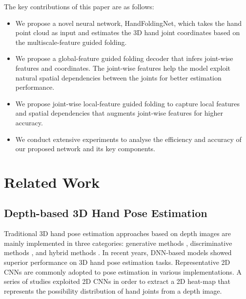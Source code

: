 \documentclass[10pt,twocolumn,letterpaper]{article}
\begin{document}
The key contributions of this paper are as follows:
\begin{itemize}\setlength{\itemsep}{0pt}
\setlength{\parsep}{0pt}
\setlength{\parskip}{0pt}



\item We propose a novel neural network, HandFoldingNet, which takes the hand point cloud as input and estimates the 3D hand joint coordinates based on the multiscale-feature guided folding. 

\item  We propose a global-feature guided folding decoder that infers joint-wise features and coordinates. The joint-wise features help the model exploit natural spatial dependencies between the joints for better estimation performance.

\item  We propose joint-wise local-feature guided folding to capture local features and spatial dependencies that augments joint-wise features for higher accuracy.

\item  We conduct extensive experiments to analyse the efficiency and accuracy of our proposed network and its key components.

\end{itemize}





\section{Related Work}
\subsection{Depth-based 3D Hand Pose Estimation}



Traditional 3D hand pose estimation approaches based on depth images are mainly implemented in three categories: generative methods \cite{khamis2015learning, tzionas2016capturing, tkach2017online, romero2017embodied}, discriminative methods \cite{keskin2012hand, liang2014parsing}, and hybrid methods \cite{taylor2016efficient, sharp2015accurate, tang2015opening}. In recent years, DNN-based models showed superior performance on 3D hand pose estimation tasks. Representative 2D CNNs are commonly adopted to pose estimation in various implementations. A series of studies \cite{tompson2014real, ge2016robust} exploited 2D CNNs in order to extract a 2D heat-map that represents the possibility distribution of hand joints from a depth image. 
\end{document}
